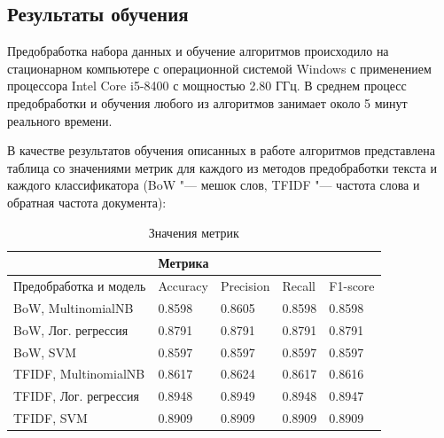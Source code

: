 \documentclass[bachelor, och, coursework]{SCWorks}
\begin{document}
    \subsection{Результаты обучения}

        Предобработка набора данных и обучение алгоритмов происходило на
        стационарном компьютере с операционной системой Windows с применением
        процессора Intel Core i5-8400 с мощностью 2.80 ГГц. В среднем процесс
        предобработки и обучения любого из алгоритмов занимает около 5 минут
        реального времени.

        В качестве результатов обучения описанных в работе алгоритмов
        представлена таблица со значениями метрик для каждого из методов
        предобработки текста и каждого классификатора (BoW "--- мешок слов,
        TFIDF "--- частота слова и обратная частота документа):

        \begin{table}[h]
            \centering
            \begin{tabular}{l|llll|}
            \cline{2-5}
                                                        & \multicolumn{4}{l|}{Метрика}                                                                            \\ \hline
            \multicolumn{1}{|l|}{Предобработка и модель}                &
            \multicolumn{1}{l|}{Accuracy} & \multicolumn{1}{l|}{Precision} &
            \multicolumn{1}{l|}{Recall} & F1-score \\ \hline
            \multicolumn{1}{|l|}{BoW, MultinomialNB}    & \multicolumn{1}{l|}{0.8598}   & \multicolumn{1}{l|}{0.8605}    & \multicolumn{1}{l|}{0.8598} & 0.8598   \\ \hline
            \multicolumn{1}{|l|}{BoW, Лог. регрессия}   & \multicolumn{1}{l|}{0.8791}   & \multicolumn{1}{l|}{0.8791}    & \multicolumn{1}{l|}{0.8791} & 0.8791   \\ \hline
            \multicolumn{1}{|l|}{BoW, SVM}              & \multicolumn{1}{l|}{0.8597}   & \multicolumn{1}{l|}{0.8597}    & \multicolumn{1}{l|}{0.8597} & 0.8597   \\ \hline
            \multicolumn{1}{|l|}{TFIDF, MultinomialNB}  & \multicolumn{1}{l|}{0.8617}   & \multicolumn{1}{l|}{0.8624}    & \multicolumn{1}{l|}{0.8617} & 0.8616   \\ \hline
            \multicolumn{1}{|l|}{TFIDF, Лог. регрессия} & \multicolumn{1}{l|}{0.8948}   & \multicolumn{1}{l|}{0.8949}    & \multicolumn{1}{l|}{0.8948} & 0.8947   \\ \hline
            \multicolumn{1}{|l|}{TFIDF, SVM}            & \multicolumn{1}{l|}{0.8909}   & \multicolumn{1}{l|}{0.8909}    & \multicolumn{1}{l|}{0.8909} & 0.8909   \\ \hline
            \end{tabular}
            \captionsetup{justification=centering}
            \caption{Значения метрик}
        \end{table}
\end{document}

